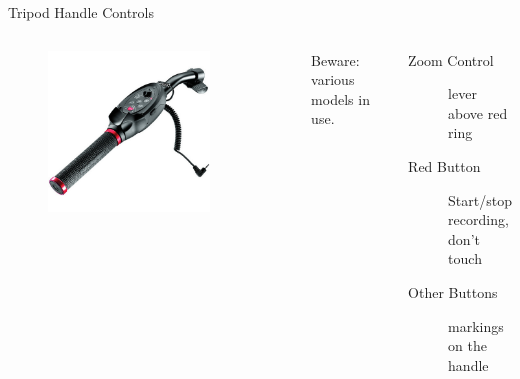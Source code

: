 \documentclass[hyperref={pdfpagelabels=false}]{beamer}
\begin{document}
\begin{frame}{Tripod Handle Controls}
	\begin{columns}[T,onlytextwidth]
	\begin{figure} 
		\centering
		\includegraphics[width=0.8\textwidth]{tripod-handle.jpeg}
	\end{figure}
	Beware: various models in use.
	\begin{description}
		\item[Zoom Control] lever above red ring
		\item[Red Button] Start/stop recording, don't touch
		\item[Other Buttons] markings on the handle
    \end{description}
	\end{columns}
\end{frame}
\end{document}

